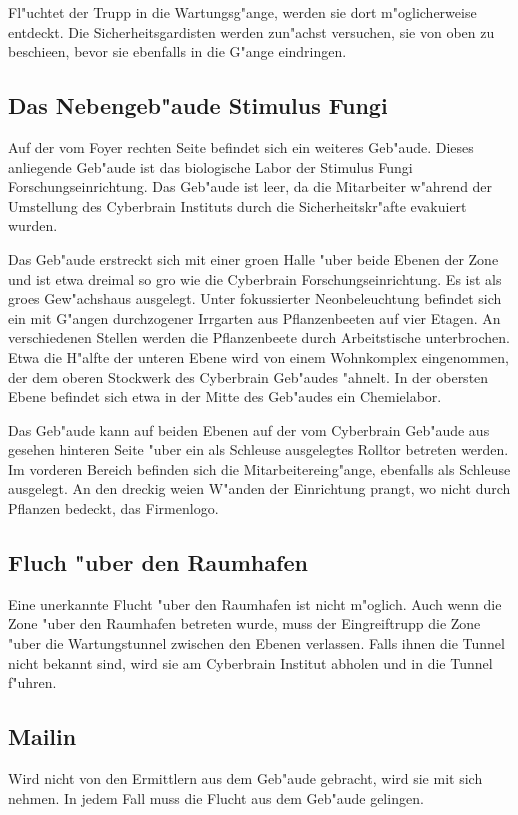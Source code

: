 Fl"uchtet der Trupp in die Wartungsg"ange, werden sie dort m"oglicherweise entdeckt. Die Sicherheitsgardisten werden zun"achst versuchen, sie von oben zu beschie\3en, bevor sie ebenfalls in die G"ange eindringen.

\subsection{Das Nebengeb"aude Stimulus Fungi} 
Auf der vom Foyer rechten Seite befindet sich ein weiteres Geb"aude. Dieses anliegende Geb"aude ist das biologische Labor der Stimulus Fungi Forschungseinrichtung. Das Geb"aude ist leer, da die Mitarbeiter w"ahrend der Umstellung des Cyberbrain Instituts durch die Sicherheitskr"afte evakuiert wurden.

Das Geb"aude erstreckt sich mit einer gro\3en Halle "uber beide Ebenen der Zone und ist etwa dreimal so gro\3 wie die Cyberbrain Forschungseinrichtung. Es ist als gro\3es Gew"achshaus ausgelegt. Unter fokussierter Neonbeleuchtung befindet sich ein mit G"angen durchzogener Irrgarten aus Pflanzenbeeten auf vier Etagen. An verschiedenen Stellen werden die Pflanzenbeete durch Arbeitstische unterbrochen. Etwa die H"alfte der unteren Ebene wird von einem Wohnkomplex eingenommen, der dem oberen Stockwerk des Cyberbrain Geb"audes "ahnelt. In der obersten Ebene befindet sich etwa in der Mitte des Geb"audes ein Chemielabor.

Das Geb"aude kann auf beiden Ebenen auf der vom Cyberbrain Geb"aude aus gesehen hinteren Seite "uber ein als Schleuse ausgelegtes Rolltor betreten werden. Im vorderen Bereich befinden sich die Mitarbeitereing"ange, ebenfalls als Schleuse ausgelegt. An den dreckig wei\3en W"anden der Einrichtung prangt, wo nicht durch Pflanzen bedeckt, das Firmenlogo.

\subsection{Fluch "uber den Raumhafen}
Eine unerkannte Flucht "uber den Raumhafen ist nicht m"oglich. Auch wenn die Zone "uber den Raumhafen betreten wurde, muss der Eingreiftrupp die Zone "uber die Wartungstunnel zwischen den Ebenen verlassen. Falls ihnen die Tunnel nicht bekannt sind, wird \xl{} sie am Cyberbrain Institut abholen und in die Tunnel f"uhren.

\subsection[\ml{}]{Mailin}
Wird \ml{} nicht von den Ermittlern aus dem Geb"aude gebracht, wird \xl{} sie mit sich nehmen. In jedem Fall muss \ml{} die Flucht aus dem Geb"aude gelingen.
\vfill

